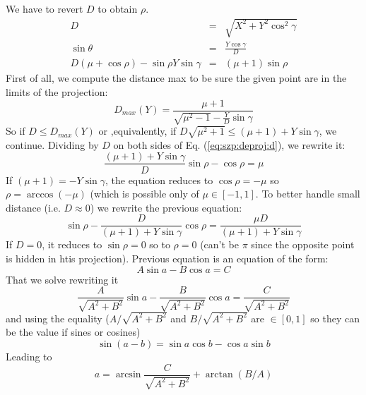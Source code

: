       We have to revert $D$ to obtain $\rho$.
      \begin{eqnarray}
        D & = & \sqrt{X^2 + Y^2\cos^2\gamma} \\
	\sin\theta & = & \frac{Y\cos\gamma}{D} \\
	D(\mu + \cos\rho) - \sin\rho Y\sin\gamma & = & (\mu + 1)\sin\rho \label{eq:szp:deproj:d}
      \end{eqnarray}
      First of all, we compute the distance max to be sure the given point are in the limits of the projection:
      \begin{equation}
        D_{max}(Y) = \frac{\mu + 1}{\sqrt{\mu^2 - 1} - \frac{Y}{D}\sin\gamma}
      \end{equation}
      So if $D \le D_{max}(Y)$ or ,equivalently, if $D\sqrt{\mu^2+1}\le (\mu + 1) + Y\sin\gamma$, we continue.
      Dividing by $D$ on both sides of Eq. (\ref{eq:szp:deproj:d}), we rewrite it:
      \begin{equation}
        \frac{(\mu + 1) + Y\sin\gamma}{D}\sin\rho - \cos\rho = \mu
      \end{equation}
      If $(\mu + 1) = -Y\sin\gamma$, the equation reduces to $\cos\rho = -\mu$ so $\rho=\arccos(-\mu)$ (which is possible only of $\mu \in [-1, 1]$.
      To better handle small distance (i.e. $D\approx 0$) we rewrite the previous equation:
      \begin{equation}
        \sin\rho - \frac{D}{(\mu + 1) + Y\sin\gamma}\cos\rho = \frac{\mu D}{(\mu + 1) + Y\sin\gamma}
      \end{equation}
      If $D=0$, it reduces to $\sin\rho=0$ so to $\rho=0$ (can't be $\pi$ since the opposite point is hidden in htis projection).
      Previous equation is an equation of the form:
      \begin{equation}
        A\sin a - B\cos a = C
      \end{equation}
      That we solve rewriting it
      \begin{equation}
        \frac{A}{\sqrt{A^2 + B^2}}\sin a - \frac{B}{\sqrt{A^2 + B^2}}\cos a = \frac{C}{\sqrt{A^2 + B^2}}
      \end{equation}
      and using the equality ($A/\sqrt{A^2 + B^2}$ and $B/\sqrt{A^2+B^2}$ are $\in [0, 1]$ so they can be the value if sines or cosines)
      \begin{equation}
        \sin(a-b) = \sin a\cos b - \cos a\sin b
      \end{equation}
      Leading to
      \begin{equation}
        a = \arcsin \frac{C}{\sqrt{A^2 + B^2}} + \arctan(B/A) 
      \end{equation}
